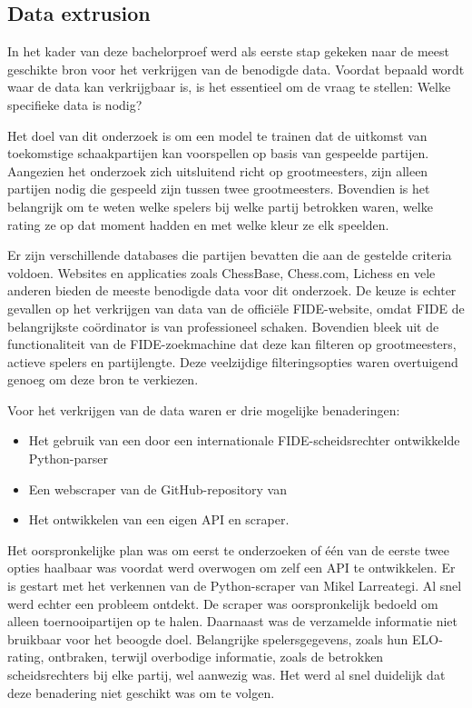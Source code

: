 \subsection{Data extrusion}

In het kader van deze bachelorproef werd als eerste stap gekeken naar de meest geschikte bron voor het verkrijgen van de benodigde data. Voordat bepaald wordt waar de data kan verkrijgbaar is, is het essentieel om de vraag te stellen: Welke specifieke data is nodig?

Het doel van dit onderzoek is om een model te trainen dat de uitkomst van toekomstige schaakpartijen kan voorspellen op basis van gespeelde partijen. Aangezien het onderzoek zich uitsluitend richt op grootmeesters, zijn alleen partijen nodig die gespeeld zijn tussen twee grootmeesters. Bovendien is het belangrijk om te weten welke spelers bij welke partij betrokken waren, welke rating ze op dat moment hadden en met welke kleur ze elk speelden.

Er zijn verschillende databases die partijen bevatten die aan de gestelde criteria voldoen. Websites en applicaties zoals ChessBase, Chess.com, Lichess en vele anderen bieden de meeste benodigde data voor dit onderzoek. De keuze is echter gevallen op het verkrijgen van data van de officiële FIDE-website, omdat FIDE de belangrijkste coördinator is van professioneel schaken. Bovendien bleek uit de functionaliteit van de FIDE-zoekmachine dat deze kan filteren op grootmeesters, actieve spelers en partijlengte. Deze veelzijdige filteringsopties waren overtuigend genoeg om deze bron te verkiezen.

Voor het verkrijgen van de data waren er drie mogelijke benaderingen:

\begin{itemize}
    \item Het gebruik van een door een internationale FIDE-scheidsrechter ontwikkelde Python-parser \autocite{Larreategi}
    \item Een webscraper van de GitHub-repository van \textcite{Alves2020}
    \item Het ontwikkelen van een eigen API en scraper.
\end{itemize}

Het oorspronkelijke plan was om eerst te onderzoeken of één van de eerste twee opties haalbaar was voordat werd overwogen om zelf een API te ontwikkelen. Er is gestart met het verkennen van de Python-scraper van Mikel Larreategi. Al snel werd echter een probleem ontdekt. De scraper was oorspronkelijk bedoeld om alleen toernooipartijen op te halen. Daarnaast was de verzamelde informatie niet bruikbaar voor het beoogde doel. Belangrijke spelersgegevens, zoals hun ELO-rating, ontbraken, terwijl overbodige informatie, zoals de betrokken scheidsrechters bij elke partij, wel aanwezig was. Het werd al snel duidelijk dat deze benadering niet geschikt was om te volgen.

